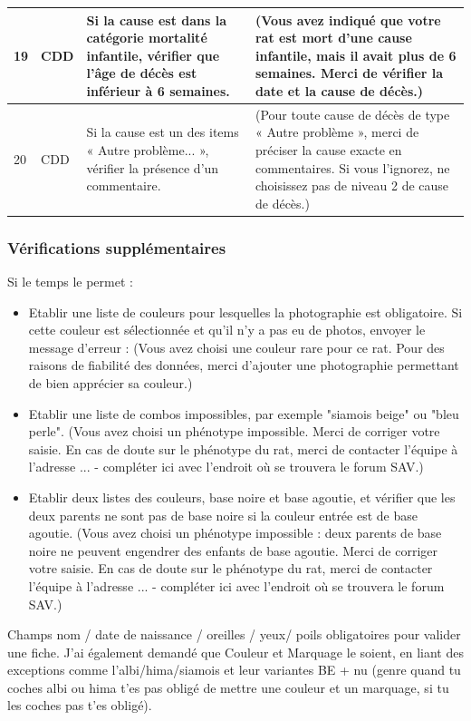 \documentclass[a4paper,10pt]{article}
\begin{document}
\begin{tabular}{|p{0.35cm}|p{1.35cm}|p{5cm}|p{8.5cm}|}
19 & CDD & Si la cause est dans la catégorie mortalité infantile, vérifier que l'âge de décès est inférieur à 6 semaines. & (Vous avez indiqué que votre rat est mort d'une cause infantile, mais il avait plus de 6 semaines. Merci de vérifier la date et la cause de décès.)\\\hline


20 & CDD & Si la cause est un des items « Autre problème... », vérifier la présence d'un commentaire. & (Pour toute cause de décès de type « Autre problème », merci de préciser la cause exacte en commentaires. Si vous l'ignorez, ne choisissez pas de niveau 2 de cause de décès.)\\\hline


\end{tabular}
\normalsize

\subsubsection{Vérifications supplémentaires}

Si le temps le permet : 

\begin{itemize}
\item Etablir une liste de couleurs pour lesquelles la photographie est obligatoire. Si cette couleur est sélectionnée et qu'il n'y a pas eu de photos, envoyer le message d'erreur : (Vous avez choisi une couleur rare pour ce rat. Pour des raisons de fiabilité des données, merci d'ajouter une photographie permettant de bien apprécier sa couleur.)
\item Etablir une liste de combos impossibles, par exemple "siamois beige" ou "bleu perle". (Vous avez choisi un phénotype impossible. Merci de corriger votre saisie. En cas de doute sur le phénotype du rat, merci de contacter l'équipe à l'adresse ... - compléter ici avec l'endroit où se trouvera le forum SAV.)
\item Etablir deux listes des couleurs, base noire et base agoutie, et vérifier que les deux parents ne sont pas de base noire si la couleur entrée est de base agoutie. (Vous avez choisi un phénotype impossible : deux parents de base noire ne peuvent engendrer des enfants de base agoutie. Merci de corriger votre saisie. En cas de doute sur le phénotype du rat, merci de contacter l'équipe à l'adresse ... - compléter ici avec l'endroit où se trouvera le forum SAV.)
\end{itemize}

Champs nom / date de naissance / oreilles / yeux/ poils obligatoires pour valider une fiche. J'ai également demandé que Couleur et Marquage le soient, en liant des exceptions comme l'albi/hima/siamois et leur variantes BE + nu (genre quand tu coches albi ou hima t'es pas obligé de mettre une couleur et un marquage, si tu les coches pas t'es obligé).
\end{document}
